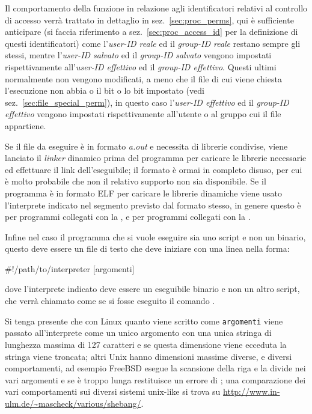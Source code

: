 
Il comportamento della funzione in relazione agli identificatori relativi al
controllo di accesso verrà trattato in dettaglio in sez.~\ref{sec:proc_perms},
qui è sufficiente anticipare (si faccia riferimento a
sez.~\ref{sec:proc_access_id} per la definizione di questi identificatori)
come l'\textsl{user-ID reale} ed il \textsl{group-ID reale} restano sempre gli
stessi, mentre l'\textsl{user-ID salvato} ed il \textsl{group-ID salvato}
vengono impostati rispettivamente all'\textsl{user-ID effettivo} ed il
\textsl{group-ID effettivo}. Questi ultimi normalmente non vengono modificati,
a meno che il file di cui viene chiesta l'esecuzione non abbia o il 
bit o lo  bit impostato (vedi sez.~\ref{sec:file_special_perm}), in
questo caso l'\textsl{user-ID effettivo} ed il \textsl{group-ID effettivo}
vengono impostati rispettivamente all'utente o al gruppo cui il file
appartiene.

Se il file da eseguire è in formato \emph{a.out} e necessita di librerie
condivise, viene lanciato il \textit{linker} dinamico  prima
del programma per caricare le librerie necessarie ed effettuare il link
dell'eseguibile; il formato è ormai in completo disuso, per cui è molto
probabile che non il relativo supporto non sia disponibile. Se il programma è
in formato ELF per caricare le librerie dinamiche viene usato l'interprete
indicato nel segmento  previsto dal formato stesso, in
genere questo è  per programmi collegati con la
, e  per programmi collegati con la
.

Infine nel caso il programma che si vuole eseguire sia uno script e non un
binario, questo deve essere un file di testo che deve iniziare con una linea
nella forma:
\begin{Example}
#!/path/to/interpreter [argomenti]
\end{Example}
dove l'interprete indicato deve essere un eseguibile binario e non un altro
script, che verrà chiamato come se si fosse eseguito il comando
. 

Si tenga presente che con Linux quanto viene scritto come \texttt{argomenti}
viene passato all'interprete come un unico argomento con una unica stringa di
lunghezza massima di 127 caratteri e se questa dimensione viene ecceduta la
stringa viene troncata; altri Unix hanno dimensioni massime diverse, e diversi
comportamenti, ad esempio FreeBSD esegue la scansione della riga e la divide
nei vari argomenti e se è troppo lunga restituisce un errore di
; una comparazione dei vari comportamenti sui diversi
sistemi unix-like si trova su
\url{http://www.in-ulm.de/~mascheck/various/shebang/}.


